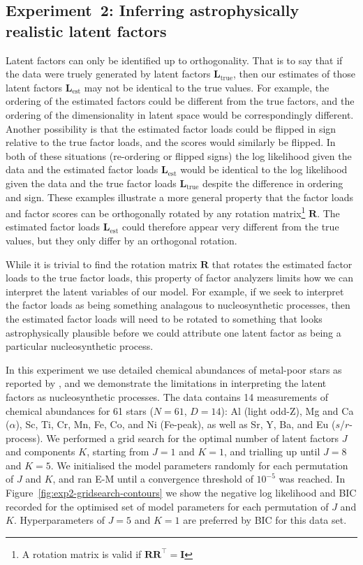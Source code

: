 \documentclass[twocolumn]{aastex61}
\newcommand{\vect}[1]{\boldsymbol{\mathbf{#1}}}
\renewcommand{\vec}[1]{\vect{#1}}
\newcommand{\transpose}{^\intercal}
\newcommand{\factorloads}{\textbf{L}}
\begin{document}
\subsection{Experiment~2: Inferring astrophysically realistic latent factors}

Latent factors can only be identified up to orthogonality. That is to say that
if the data were truely generated by latent factors $\factorloads_\textrm{true}$,
then our estimates of those latent factors $\factorloads_\textrm{est}$ may not
be identical to the true values. For example, the ordering of the estimated factors
could be different from the true factors, and the ordering of the dimensionality
in latent space would be correspondingly different. Another possibility is that
the estimated factor loads could be flipped in sign relative to the true factor
loads, and the scores would similarly be flipped. In both of these situations
(re-ordering or flipped signs) the log likelihood given the data and the
estimated factor loads $\factorloads_\textrm{est}$ would be identical to the
log likelihood given the data and the true factor loads $\factorloads_\textrm{true}$
despite the difference in ordering and sign. These examples illustrate a more 
general property that the factor loads and factor scores can be orthogonally 
rotated by any rotation matrix\footnote{A rotation matrix is valid if 
$\vec{R}\vec{R}\transpose = \vec{I}$} $\vec{R}$. The estimated factor loads 
$\factorloads_\textrm{est}$ could therefore appear very different from the true 
values, but they only differ by an orthogonal rotation. 


While it is trivial to find the rotation matrix $\vec{R}$ that rotates the estimated
factor loads to the true factor loads, this property of factor analyzers limits
how we can interpret the latent variables of our model. For example, if we seek
to interpret the factor loads as being something analagous to nucleosynthetic
processes, then the estimated factor loads will need to be rotated to something
that looks astrophysically plausible before we could attribute one latent factor
as being a particular nucleosynthetic process.


In this experiment we use detailed chemical abundances of metal-poor stars as
reported by \citet{Barklem:2003}, and we demonstrate the limitations in
interpreting the latent factors as nucleosynthetic processes. The data contains
14 measurements of chemical abundances for 61 stars ($N = 61$, $D = 14$): 
Al (light odd-Z), Mg and Ca ($\alpha$), Sc, Ti, Cr, Mn, Fe, Co, and Ni (Fe-peak),
as well as Sr, Y, Ba, and Eu ($s$/$r$-process). We performed a grid search for
the optimal number of latent factors $J$ and components $K$, starting from
$J = 1$ and $K = 1$, and trialling up until $J = 8$ and $K = 5$. We initialised
the model parameters randomly for each permutation of $J$ and $K$, and ran E-M
until a convergence threshold of $10^{-5}$ was reached. In Figure~\ref{fig:exp2-gridsearch-contours}
we show the negative log likelihood and BIC recorded for the optimised set of
model parameters for each permutation of $J$ and $K$. Hyperparameters of $J = 5$
and $K = 1$ are preferred by BIC for this data set.
\end{document}
